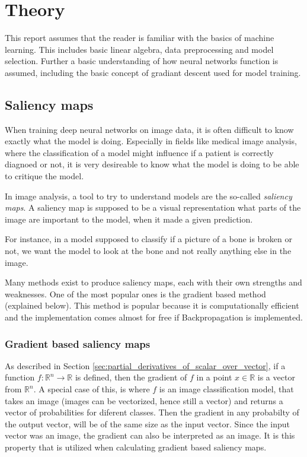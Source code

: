 \chapter{Theory}
This report assumes that the reader is familiar with the basics of machine learning.
This includes basic linear algebra, data preprocessing and model selection.
Further a basic understanding of how neural networks function is assumed,
including the basic concept of gradiant descent used for model training.

\section{Saliency maps}\label{sec:saliency_maps}
When training deep neural networks on image data,
it is often difficult to know exactly what the model is doing.
Especially in fields like medical image analysis,
where the classification of a model might influence if a patient is correctly diagnoed or not,
it is very desireable to know what the model is doing to be able to critique the model.

In image analysis, a tool to try to understand models are the so-called \textit{saliency maps}.
A saliency map is supposed to be a visual representation what parts of the image are important to the model,
when it made a given prediction.

For instance, in a model supposed to classify if a picture of a bone is broken or not,
we want the model to look at the bone and not really anything else in the image.

Many methods exist to produce saliency maps, each with their own strengths and weaknesses.
One of the most popular ones is the gradient based method (explained below).
This method is popular because it is computationally efficient and the implementation comes almost for free if Backpropagation is implemented.

\subsection{Gradient based saliency maps} \label{sec:gradiant_saliency_maps}
As described in Section \ref{sec:partial_derivatives_of_scalar_over_vector},
if a function $f: \mathbb{R}^n \rightarrow \mathbb{R}$ is defined,
then the gradient of $f$ in a point $x\in\mathbb{R}$ is a vector from $\mathbb{R}^n$.
A special case of this, is where $f$ is an image classification model, that takes
an image (images can be vectorized, hence still a vector) and returns a vector of probabilities for
diferent classes.
Then the gradient in any probabilty of the output vector, will be of the same size as the input vector.
Since the input vector was an image, the gradient can also be interpreted as an image.
It is this property that is utilized when calculating gradient based saliency maps.

